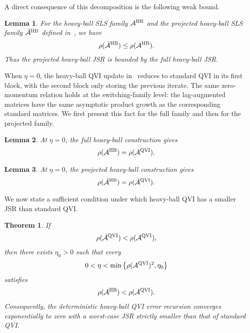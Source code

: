 \documentclass[letterpaper]{article}
\numberwithin{equation}{section}
\newtheorem{lemma}{Lemma}[section]
\newtheorem{theorem}{Theorem}[section]
\begin{document}
A direct consequence of this decomposition is the following weak bound.
\begin{lemma}
\label{lem:projected-hb-weak-bound}
For the heavy-ball SLS family $\mathcal A^{\rm HB}$ and the projected
heavy-ball SLS family $\bar{\mathcal A}^{\rm HB}$ defined in~, we have
\begin{align*}
  \rho(\bar{\mathcal A}^{\rm HB})\le \rho(\mathcal A^{\rm HB}).
\end{align*}
Thus the projected heavy-ball JSR is bounded by the full heavy-ball JSR.
\end{lemma}


When $\eta=0$, the heavy-ball QVI update in~ reduces to
standard QVI in its first block, with the second block only storing the previous
iterate. The same zero-momentum relation holds at the switching-family level:
the lag-augmented matrices have the same asymptotic product growth as the
corresponding standard matrices. We first present this fact for the full
family and then for the projected family.
\begin{lemma}
\label{lem:full-hb-zero-momentum}
At $\eta=0$, the full heavy-ball construction gives
\begin{equation*}
  \rho(\mathcal A^{\rm HB})=\rho(\mathcal A^{\rm QVI}).
\end{equation*}
\end{lemma}

\begin{lemma}
\label{lem:projected-hb-zero-momentum}
At $\eta=0$, the projected heavy-ball construction gives
\begin{equation*}
  \rho(\bar{\mathcal A}^{\rm HB})=\rho(\bar{\mathcal A}^{\rm QVI}).
\end{equation*}
\end{lemma}


We now state a sufficient condition under which heavy-ball QVI has a smaller
JSR than standard QVI.

\begin{theorem}
\label{thm:hb-global-jsr-improvement}
If
\begin{equation}
  \rho(\bar{\mathcal A}^{\rm QVI})<\rho(\mathcal A^{\rm QVI}),
  \label{eq:projected-ql-gap}
\end{equation}
then there exists $\eta_0>0$ such that every
\begin{equation*}
  0<\eta<\min\left\{\rho(\mathcal A^{\rm QVI})^2,\eta_0\right\}
\end{equation*}
satisfies
\begin{equation*}
  \rho(\mathcal A^{\rm HB})
  <\rho(\mathcal A^{\rm QVI}).
\end{equation*}
Consequently, the deterministic heavy-ball QVI error recursion converges
exponentially to zero with a worst-case JSR strictly smaller than that of
standard QVI.
\end{theorem}
\end{document}

